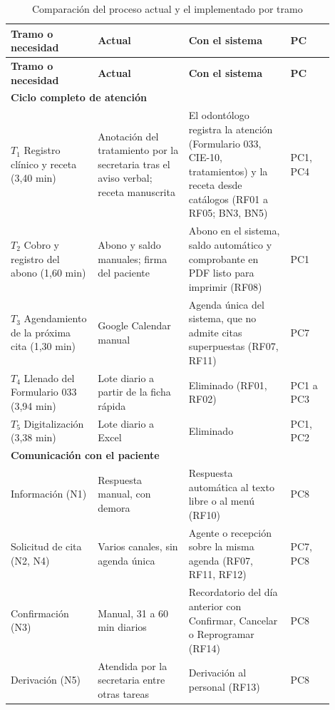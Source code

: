 \begin{longtable}{|p{0.24\linewidth}|p{0.25\linewidth}|p{0.29\linewidth}|p{0.12\linewidth}|}
\caption{Comparación del proceso actual y el implementado por tramo}
\label{tab:ob3_asis_tobe} \\
\hline
\textbf{Tramo o necesidad} & \textbf{Actual} & \textbf{Con el sistema} & \textbf{PC} \\ \hline
\endfirsthead
\hline
\textbf{Tramo o necesidad} & \textbf{Actual} & \textbf{Con el sistema} & \textbf{PC} \\ \hline
\endhead
\multicolumn{4}{|l|}{\cellcolor{gray!10}\textbf{Ciclo completo de atención}} \\ \hline
$T_1$ Registro clínico y receta (3,40 min) & Anotación del tratamiento por la secretaria tras el aviso verbal; receta manuscrita & El odontólogo registra la atención (Formulario 033, CIE-10, tratamientos) y la receta desde catálogos (RF01 a RF05; BN3, BN5) & PC1, PC4 \\ \hline
$T_2$ Cobro y registro del abono (1,60 min) & Abono y saldo manuales; firma del paciente & Abono en el sistema, saldo automático y comprobante en PDF listo para imprimir (RF08) & PC1 \\ \hline
$T_3$ Agendamiento de la próxima cita (1,30 min) & Google Calendar manual & Agenda única del sistema, que no admite citas superpuestas (RF07, RF11) & PC7 \\ \hline
$T_4$ Llenado del Formulario 033 (3,94 min) & Lote diario a partir de la ficha rápida & Eliminado (RF01, RF02) & PC1 a PC3 \\ \hline
$T_5$ Digitalización (3,38 min) & Lote diario a Excel & Eliminado & PC1, PC2 \\ \hline
\multicolumn{4}{|l|}{\cellcolor{gray!10}\textbf{Comunicación con el paciente}} \\ \hline
Información (N1) & Respuesta manual, con demora & Respuesta automática al texto libre o al menú (RF10) & PC8 \\ \hline
Solicitud de cita (N2, N4) & Varios canales, sin agenda única & Agente o recepción sobre la misma agenda (RF07, RF11, RF12) & PC7, PC8 \\ \hline
Confirmación (N3) & Manual, 31 a 60 min diarios & Recordatorio del día anterior con Confirmar, Cancelar o Reprogramar (RF14) & PC8 \\ \hline
Derivación (N5) & Atendida por la secretaria entre otras tareas & Derivación al personal (RF13) & PC8 \\ \hline
\end{longtable}
\endgroup

